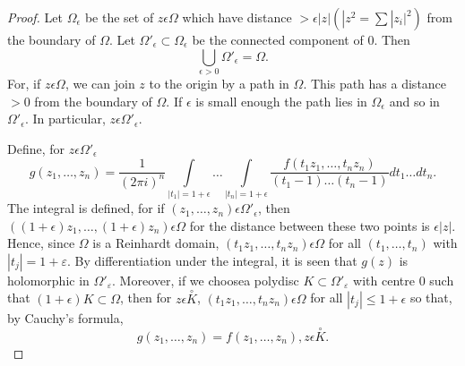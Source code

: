 \begin{proof}
Let $\Omega_\epsilon$ be the set of $z \epsilon \Omega$ which have distance $>
\epsilon |z| (|z^2 = \sum |z_i|^2)$ from the boundary of $\Omega$. Let
$\Omega'_\epsilon \subset \Omega_\epsilon$ be the connected component of
$0$. Then
$$
\bigcup\limits_{\epsilon > 0} \Omega'_\epsilon = \Omega.
$$
For, if $z\epsilon \Omega$, we can join $z$ to the origin by a path in
$\Omega$. This path has a distance $>0$ from the boundary of
$\Omega$. If $\epsilon$ is small enough the path lies in $\Omega_\epsilon$ and
so in $\Omega'_\epsilon$. In particular, $z \epsilon \Omega'_\epsilon$.

Define, for $z\epsilon \Omega'_\epsilon$
$$
g(z_1,\ldots, z_n) = \frac{1}{(2\pi i)^n} \int\limits_{|t_1| = 1+\epsilon}
\ldots \int\limits_{|t_n| = 1+ \epsilon} \frac{f(t_1 z_1, \ldots, t_n
  z_n)}{(t_1-1) \ldots (t_n-1)} dt_1 \ldots dt_n. 
$$
The integral is defined, for if $(z_1, \ldots, z_n) \epsilon \Omega'_\epsilon$,
then $((1+\epsilon) z_1, \ldots, (1+\epsilon)z_n) \epsilon\Omega$ for
the distance 
between these two points is $\epsilon|z|$. Hence, since $\Omega$ is a
Reinhardt domain, $(t_1 z_1, \ldots, t_n z_n) \epsilon \Omega$ for all
$(t_1, \ldots, t_n)$ with $|t_j| = 1+ \varepsilon$. By differentiation
under the integral, it is seen that $g(z)$ is holomorphic in
$\Omega'_\varepsilon$. Moreover, if we choose\pageoriginale a polydisc
$K \subset \Omega'_\varepsilon$ with centre 0 such that $(1+\epsilon) K
\subset \Omega$, then for $z \epsilon \overset{\circ}{K}$, $(t_1 z_1,
\ldots, t_n z_n) \epsilon \Omega$ for all $|t_j|\leq 1+ \epsilon $ so that, by
Cauchy's formula, 
$$
g(z_1, \ldots , z_n) = f(z_1, \ldots, z_n), z \epsilon \overset{\circ}{K}. 
$$


\end{proof}
